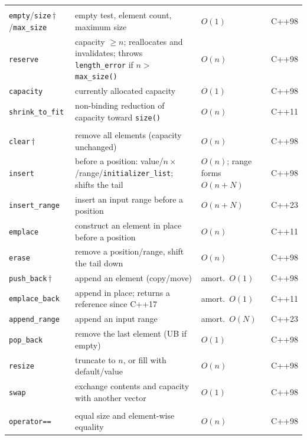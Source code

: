 \begin{longtable}{@{}>{\raggedright\arraybackslash}p{3.1cm} >{\raggedright\arraybackslash}p{5.7cm} >{\raggedright\arraybackslash}p{2.7cm} >{\raggedright\arraybackslash}p{1.1cm}@{}}
  \addlinespace[3pt]
  \multicolumn{4}{@{}l}{\textbf{Capacity}}\\
  \addlinespace[2pt]
  \texttt{empty}/\allowbreak\texttt{size}\,$\dagger$/\allowbreak\texttt{max\_size} & empty test, element count, maximum size & $O(1)$ & C++98 \\
  \texttt{reserve} & capacity $\ge n$; reallocates and invalidates; throws \texttt{length\_error} if $n>$\texttt{max\_size()} & $O(n)$ & C++98 \\
  \texttt{capacity} & currently allocated capacity & $O(1)$ & C++98 \\
  \texttt{shrink\_to\_fit} & non-binding reduction of capacity toward \texttt{size()} & $O(n)$ & C++11 \\
  \addlinespace[3pt]
  \multicolumn{4}{@{}l}{\textbf{Modifiers}}\\
  \addlinespace[2pt]
  \texttt{clear}\,$\dagger$ & remove all elements (capacity unchanged) & $O(n)$ & C++98 \\
  \texttt{insert} & before a position: value/$n\times$/range/\allowbreak\texttt{initializer\_list}; shifts the tail & $O(n)$; range forms $O(n{+}N)$ & C++98 \\
  \texttt{insert\_range} & insert an input range before a position & $O(n{+}N)$ & C++23 \\
  \texttt{emplace} & construct an element in place before a position & $O(n)$ & C++11 \\
  \texttt{erase} & remove a position/range, shift the tail down & $O(n)$ & C++98 \\
  \texttt{push\_back}\,$\dagger$ & append an element (copy/move) & amort.\ $O(1)$ & C++98 \\
  \texttt{emplace\_back} & append in place; returns a reference since C++17 & amort.\ $O(1)$ & C++11 \\
  \texttt{append\_range} & append an input range & amort.\ $O(N)$ & C++23 \\
  \texttt{pop\_back} & remove the last element (UB if empty) & $O(1)$ & C++98 \\
  \texttt{resize} & truncate to $n$, or fill with default/value & $O(n)$ & C++98 \\
  \texttt{swap} & exchange contents and capacity with another vector & $O(1)$ & C++98 \\
  \addlinespace[3pt]
  \multicolumn{4}{@{}l}{\textbf{Non-member functions}}\\
  \addlinespace[2pt]
  \texttt{operator==} & equal size and element-wise equality & $O(n)$ & C++98 \\

\end{longtable}
